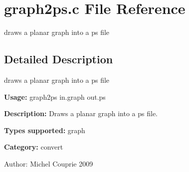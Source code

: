 \section{graph2ps.c File Reference}
\label{graph2ps_8c}
draws a planar graph into a ps file  




\label{_details}
\subsection{Detailed Description}
draws a planar graph into a ps file 

{\bf Usage:} graph2ps in.graph out.ps

{\bf Description:} Draws a planar graph into a ps file.

{\bf Types supported:} graph

{\bf Category:} convert

\begin{Desc}
\item[Author:]Michel Couprie 2009 \end{Desc}

